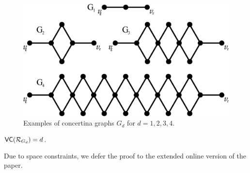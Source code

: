 \begin{figure}[ht]
  \centering
  \includegraphics[scale=0.3]{tight}
  \caption{Examples of concertina graphs $G_d$ for $d=1,2,3,4$.}
  \label{fig:tightgraphs}
\end{figure}

\begin{lemma}\label{lem:vcdimlowbound}
  $\mathsf{VC}(\mathcal{R}_{G_d})=d$.
\end{lemma}
\ifproof
\else
Due to space constraints, we defer the proof to the extended online version of
the paper.
\fi

